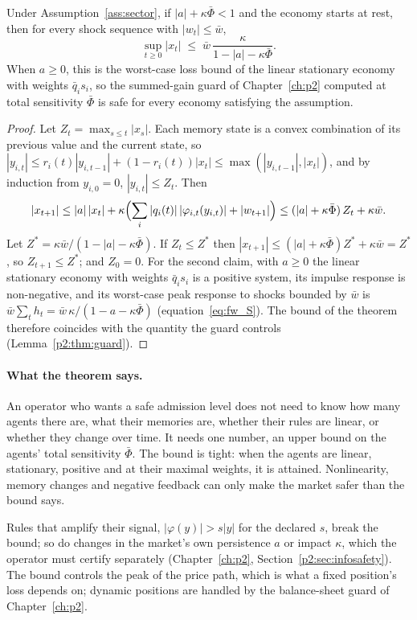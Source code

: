 \begin{theorem}\label{thm:sector}
Under Assumption~\ref{ass:sector}, if $|a|+\kappa\bar\Phi<1$ and the economy starts at rest, then for every shock sequence with $|w_t|\le\bar w$,
\[
\sup_{t\ge0}|x_t|\;\le\;\bar w\,\frac{\kappa}{1-|a|-\kappa\bar\Phi}.
\]
When $a\ge0$, this is the worst-case loss bound of the linear stationary economy with weights $\bar q_is_i$, so the summed-gain guard of Chapter~\ref{ch:p2} computed at total sensitivity $\bar\Phi$ is safe for every economy satisfying the assumption. \hfill\Proved
\end{theorem}

\begin{proof}
Let $Z_t=\max_{s\le t}|x_s|$. Each memory state is a convex combination of its previous value and the current state, so $|y_{i,t}|\le r_i(t)|y_{i,t-1}|+(1-r_i(t))|x_t|\le\max(|y_{i,t-1}|,|x_t|)$, and by induction from $y_{i,0}=0$, $|y_{i,t}|\le Z_t$. Then
\[
|x_{t+1}|\le|a|\,|x_t|+\kappa\Bigl(\sum_i|q_i(t)|\,|\varphi_{i,t}(y_{i,t})|+|w_{t+1}|\Bigr)\le(|a|+\kappa\bar\Phi)\,Z_t+\kappa\bar w .
\]
Let $Z^*=\kappa\bar w/(1-|a|-\kappa\bar\Phi)$. If $Z_t\le Z^*$ then $|x_{t+1}|\le(|a|+\kappa\bar\Phi)Z^*+\kappa\bar w=Z^*$, so $Z_{t+1}\le Z^*$; and $Z_0=0$. For the second claim, with $a\ge0$ the linear stationary economy with weights $\bar q_is_i$ is a positive system, its impulse response is non-negative, and its worst-case peak response to shocks bounded by $\bar w$ is $\bar w\sum_th_t=\bar w\,\kappa/(1-a-\kappa\bar\Phi)$ (equation~\eqref{eq:fw_S}). The bound of the theorem therefore coincides with the quantity the guard controls (Lemma~\ref{p2:thm:guard}).
\end{proof}

\paragraph{What the theorem says.} An operator who wants a safe admission level does not need to know how many agents there are, what their memories are, whether their rules are linear, or whether they change over time. It needs one number, an upper bound on the agents' total sensitivity $\bar\Phi$. The bound is tight: when the agents are linear, stationary, positive and at their maximal weights, it is attained. Nonlinearity, memory changes and negative feedback can only make the market safer than the bound says.

\begin{remark}
Rules that amplify their signal, $|\varphi(y)|>s|y|$ for the declared $s$, break the bound; so do changes in the market's own persistence $a$ or impact $\kappa$, which the operator must certify separately (Chapter~\ref{ch:p2}, Section~\ref{p2:sec:infosafety}). The bound controls the peak of the price path, which is what a fixed position's loss depends on; dynamic positions are handled by the balance-sheet guard of Chapter~\ref{ch:p2}.
\end{remark}

